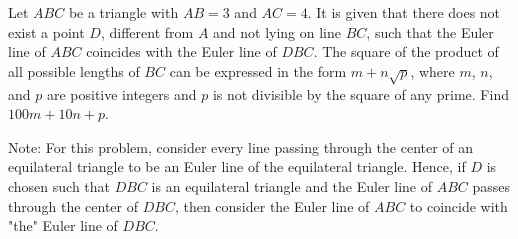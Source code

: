 Let $ABC$ be a triangle with $AB=3$ and $AC=4$. It is given that there does not exist a point $D$, different from $A$ and not lying on line $BC$, such that the Euler line of $ABC$ coincides with the Euler line of $DBC$. The square of the product of all possible lengths of $BC$ can be expressed in the form $m+n\sqrt p$, where $m$, $n$, and $p$ are positive integers and $p$ is not divisible by the square of any prime. Find $100m+10n+p$.

Note: For this problem, consider every line passing through the center of an equilateral triangle to be an Euler line of the equilateral triangle. Hence, if $D$ is chosen such that $DBC$ is an equilateral triangle and the Euler line of $ABC$ passes through the center of $DBC$, then consider the Euler line of $ABC$ to coincide with "the" Euler line of $DBC$.
